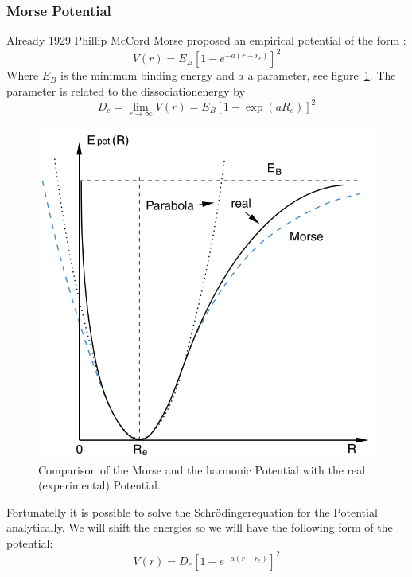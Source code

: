 \subsubsection{Morse Potential}
Already 1929 Phillip McCord Morse proposed an empirical potential
of the form \cite{Demtroeder1}:
\begin{equation}
    V(r) = E_B \left[ 1 - e^{-a(r-r_e)}  \right]^2
\end{equation}
Where $E_B$ is the minimum binding energy and $a$ a parameter,
see figure~\ref{fig:morse}. The parameter is related to the
dissociationenergy by 
\begin{equation}
    D_e = \lim\limits_{r \rightarrow \infty}{V(r)}
= E_B \left[ 1 - \exp(aR_e)  \right]^2
\end{equation}
\begin{figure}
\includegraphics[width=15cm]{pics/morse_potential}
\caption{Comparison of the Morse and the harmonic Potential
    with the real (experimental) Potential\cite{Demtroeder1}.}
\label{fig:morse}
\end{figure}
Fortunatelly it is possible to solve the Schrödingerequation
for the Potential analytically. We will shift the energies 
so we will have the following form of the potential:
\begin{equation}
    V(r) = D_e \left[ 1 - e^{-a(r-r_e)}  \right]^2
\end{equation}
